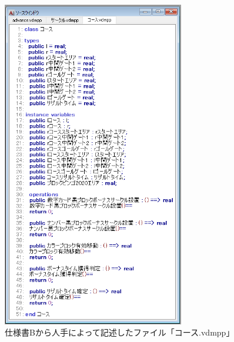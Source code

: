 \begin{figure}[tp]
    \begin{center}
    \includegraphics[width=300]{image/speB_vdm3.PNG}
    \caption{仕様書Bから人手によって記述したファイル「コース.vdmpp」}
    \label{fig:speB_vdm3}
    \end{center}
\end{figure}

